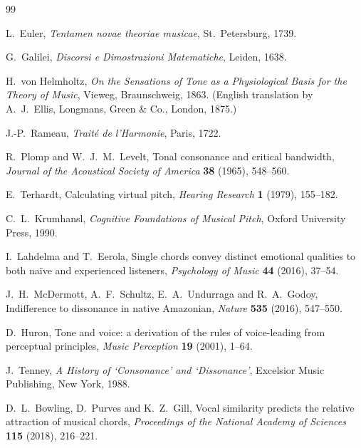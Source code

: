 \documentclass[11pt,a4paper]{article}
\begin{document}
\begin{thebibliography}{99}

L.~Euler,
\emph{Tentamen novae theoriae musicae},
St.\ Petersburg, 1739.

G.~Galilei,
\emph{Discorsi e Dimostrazioni Matematiche},
Leiden, 1638.

H.~von Helmholtz,
\emph{On the Sensations of Tone as a Physiological Basis for the Theory of Music},
Vieweg, Braunschweig, 1863.
(English translation by A.~J.~Ellis, Longmans, Green \& Co., London, 1875.)

J.-P.~Rameau,
\emph{Trait\'{e} de l'Harmonie},
Paris, 1722.

R.~Plomp and W.~J.~M.~Levelt,
Tonal consonance and critical bandwidth,
\emph{Journal of the Acoustical Society of America} \textbf{38} (1965), 548--560.

E.~Terhardt,
Calculating virtual pitch,
\emph{Hearing Research} \textbf{1} (1979), 155--182.

C.~L.~Krumhansl,
\emph{Cognitive Foundations of Musical Pitch},
Oxford University Press, 1990.

I.~Lahdelma and T.~Eerola,
Single chords convey distinct emotional qualities to both na\"{i}ve and
experienced listeners,
\emph{Psychology of Music} \textbf{44} (2016), 37--54.

J.~H.~McDermott, A.~F.~Schultz, E.~A.~Undurraga and R.~A.~Godoy,
Indifference to dissonance in native Amazonian,
\emph{Nature} \textbf{535} (2016), 547--550.

D.~Huron,
Tone and voice: a derivation of the rules of voice-leading from perceptual
principles,
\emph{Music Perception} \textbf{19} (2001), 1--64.

J.~Tenney,
\emph{A History of `Consonance' and `Dissonance'},
Excelsior Music Publishing, New York, 1988.

D.~L.~Bowling, D.~Purves and K.~Z.~Gill,
Vocal similarity predicts the relative attraction of musical chords,
\emph{Proceedings of the National Academy of Sciences} \textbf{115} (2018),
216--221.

\end{thebibliography}
\end{document}
